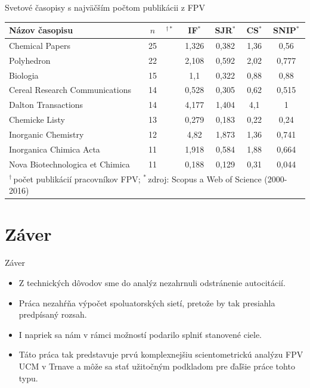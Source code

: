 \documentclass{beamer}
\begin{document}
%
%
\begin{frame}{Svetové časopisy s najväčším počtom publikácii z FPV}
  \begin{table}
    \footnotesize
    \begin{tabular}{lc@{}lcccc}
      \toprule
      Názov časopisu & $n$&$^{\dagger\ast}$ & IF$^\ast$ & SJR$^\ast$  & CS$^\ast$ & SNIP$^\ast$ \\
      \midrule
      Chemical Papers                 & 25& & 1,326           & 0,382 & 1,36           & 0,56\phantom{0} \\
      Polyhedron                      & 22& & 2,108           & 0,592 & 2,02           & 0,777           \\
      Biologia                        & 15& & 1,1\phantom{00} & 0,322 & 0,88           & 0,88\phantom{0} \\
      Cereal Research Communications  & 14& & 0,528           & 0,305 & 0,62           & 0,515           \\
      Dalton Transactions             & 14& & 4,177           & 1,404 & 4,1\phantom{0} & 1\phantom{,000} \\[1ex]
      Chemicke Listy                  & 13& & 0,279           & 0,183 & 0,22           & 0,24\phantom{0} \\
      Inorganic Chemistry             & 12& & 4,82\phantom{0} & 1,873 & 1,36           & 0,741           \\
      Inorganica Chimica Acta         & 11& & 1,918           & 0,584 & 1,88           & 0,664           \\
      Nova Biotechnologica et Chimica & 11& & 0,188           & 0,129 & 0,31           & 0,044           \\
      \bottomrule
      \multicolumn{7}{l}{\tiny $^\dagger$\,počet publikácií pracovníkov FPV; $^\ast$\,zdroj: Scopus a Web of Science (2000-2016)} \\
    \end{tabular}
  \end{table}
\end{frame}


\section{Záver}

\begin{frame}{Záver}
  \begin{itemize}
  \item<1-> Z technických dôvodov sme do analýz nezahrnuli odstránenie
    autocitácií.
  \item<2-> Práca nezahŕňa výpočet spoluatorských sietí, pretože by tak
    presiahla predpísaný rozsah.
  \item<3-> I napriek sa nám v rámci možností podarilo splniť stanovené ciele.
  \item<4-> Táto práca tak predstavuje prvú komplexnejšiu scientometrickú
    analýzu FPV UCM v Trnave a môže sa stať užitočným podkladom pre ďaľšie práce
    tohto typu.
  \end{itemize}
\end{frame}
\end{document}
